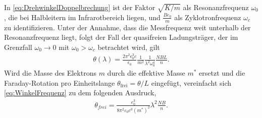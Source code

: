 In \eqref{eq:DrehwinkelDoppelbrechung} ist der Faktor $\sqrt{K/m}$ als Resonanzfrequenz $\omega_0$, die bei Halbleitern im Infrarotbereich liegen,  und $\frac{Be_0}{m}$ als 
Zyklotronfrequenz $\omega_c$ zu identifizieren. Unter der Annahme, dass die Messfrequenz weit unterhalb der Resonanzfrequenz liegt, folgt der Fall der quasifreien Ladungsträger, der
im Grenzfall $\omega_0\rightarrow0$ mit $\omega_0>\omega_c$ betrachtet wird, gilt
\begin{align}
    \label{eq:WinkelFrequenz}
    \theta(\lambda)=\frac{2\pi^2\text{e}_0^3c}{\epsilon_0}\frac{1}{m^2}\frac{1}{\lambda^2\omega_0^4}\frac{NBL}{n}.
\end{align}
Wird die Masse des Elektrons $m$ durch die effektive Masse $m^*$ ersetzt und die Faraday-Rotation pro Einheitslange $\theta_{\text{frei}}=\theta/L$ eingefügt, vereinfacht sich
\eqref{eq:WinkelFrequenz} zu dem folgenden Ausdruck,
\begin{align}
    \theta_{frei}=\frac{e_0^3}{8\pi^2\varepsilon_0c^3(m^*)^2}\lambda^2\frac{NB}{n}.
\end{align}